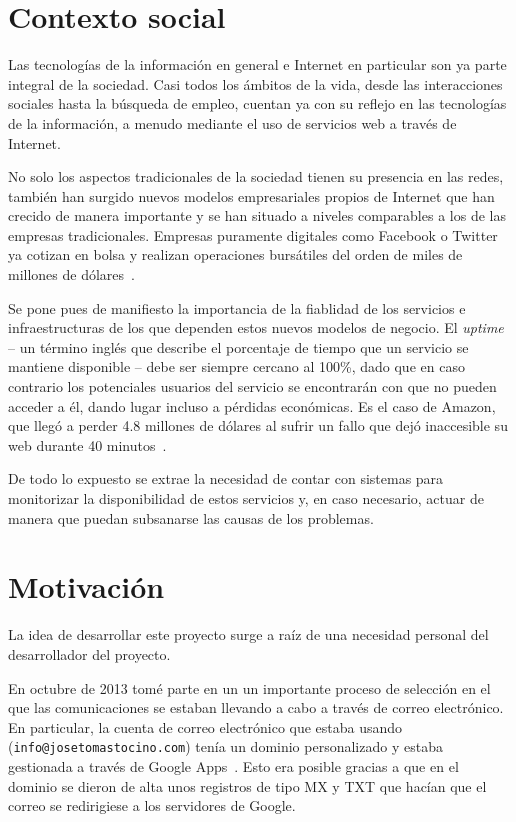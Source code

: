 \section{Contexto social}

Las tecnologías de la información en general e Internet en particular son ya
parte integral de la sociedad. Casi todos los ámbitos de la vida,
desde las interacciones sociales hasta la búsqueda de empleo, cuentan ya con
su reflejo en las tecnologías de la información, a menudo mediante el uso de
servicios web a través de Internet.

No solo los aspectos tradicionales de la sociedad tienen su presencia en las
redes, también han surgido nuevos modelos empresariales propios de Internet que
han crecido de manera importante y se han situado a niveles comparables a los de
las empresas tradicionales. Empresas puramente digitales como Facebook o Twitter
ya cotizan en bolsa y realizan operaciones bursátiles del orden de miles de
millones de dólares~\cite{facebook-acquires-whatsapp}.

Se pone pues de manifiesto la importancia de la fiablidad de los servicios e
infraestructuras de los que dependen estos nuevos modelos de negocio. El
\textit{uptime} -- un término inglés que describe el porcentaje de tiempo que un
servicio se mantiene disponible -- debe ser siempre cercano al 100\%, dado que
en caso contrario los potenciales usuarios del servicio se encontrarán con que
no pueden acceder a él, dando lugar incluso a pérdidas económicas. Es el caso de
Amazon, que llegó a perder 4.8 millones de dólares al sufrir un fallo que dejó
inaccesible su web durante 40 minutos~\cite{amazon}.

De todo lo expuesto se extrae la necesidad de contar con sistemas para
monitorizar la disponibilidad de estos servicios y, en caso necesario, actuar de
manera que puedan subsanarse las causas de los problemas.

\section{Motivación}
\label{sec:situacion-actual}

La idea de desarrollar este proyecto surge a raíz de una necesidad
personal del desarrollador del proyecto. 

En octubre de 2013 tomé parte en un un importante proceso de selección en el que
las comunicaciones se estaban llevando a cabo a través de correo electrónico. En
particular, la cuenta de correo electrónico que estaba usando
(\texttt{info@josetomastocino.com}) tenía un dominio personalizado y estaba
gestionada a través de Google Apps~\cite{google-apps}. Esto era posible gracias
a que en el dominio se dieron de alta unos registros de tipo MX y TXT que hacían
que el correo se redirigiese a los servidores de Google.

